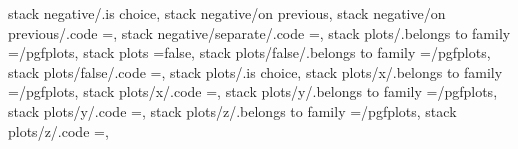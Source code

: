 stack negative/.is choice,
stack negative/on previous,
stack negative/on previous/.code                                   ={\def\pgfplots@stacked@negative@mode{P}},                                                                                          
stack negative/separate/.code                                      ={\def\pgfplots@stacked@negative@mode{S}},                                                                                          
stack plots/.belongs to family                                     =/pgfplots,                                                                                                                         
stack plots                                                        =false,                                                                                                                             
stack plots/false/.belongs to family                               =/pgfplots,                                                                                                                         
stack plots/false/.code                                            ={\pgfplots@stackedmodefalse},                                                                                                      
stack plots/.is choice,
stack plots/x/.belongs to family                                   =/pgfplots,                                                                                                                         
stack plots/x/.code                                                ={\def\pgfplots@stacked@dir{x}\pgfplots@stackedmodetrue},                                                                           
stack plots/y/.belongs to family                                   =/pgfplots,                                                                                                                         
stack plots/y/.code                                                ={\def\pgfplots@stacked@dir{y}\pgfplots@stackedmodetrue},                                                                           
stack plots/z/.belongs to family                                   =/pgfplots,                                                                                                                         
stack plots/z/.code                                                ={\def\pgfplots@stacked@dir{z}\pgfplots@stackedmodetrue},                                                                           

